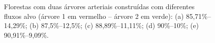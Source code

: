 \begin{figure}[!htb]
  \centering
  \captiondelim{: }
  \caption{Florestas com duas árvores arteriais construídas com diferentes fluxos alvo (árvore 1 em vermelho -- árvore 2 em verde): 
  (a) 85,71\%--14,29\%; (b) 87,5\%--12,5\%;  (c) 88,89\%--11,11\%;  (d) 90\%--10\%;  (e) 90,91\%--9,09\%.}
  
  \hspace{12pt}


\end{figure}
